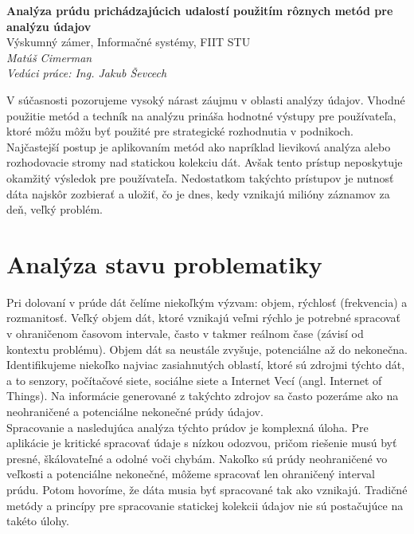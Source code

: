 \documentclass[11pt]{article}
\begin{document}
\begin{center}
	{\LARGE \textbf{Analýza prúdu prichádzajúcich udalostí použitím rôznych metód pre analýzu údajov}}\\
	{\Large Výskumný zámer, Informačné systémy, FIIT STU}
	\\
	{\large \textit{Matúš Cimerman}}
	\\
	{\large \textit{Vedúci práce: Ing. Jakub Ševcech}}
\end{center}
V súčasnosti pozorujeme vysoký nárast záujmu v oblasti analýzy údajov. Vhodné použitie metód a techník na analýzu prináša hodnotné výstupy pre používateľa, ktoré môžu môžu byť použité pre strategické rozhodnutia v podnikoch. Najčastejší postup je aplikovaním metód ako napríklad lieviková analýza alebo rozhodovacie stromy nad statickou kolekciu dát. Avšak tento prístup neposkytuje okamžitý výsledok pre používateľa. Nedostatkom takýchto prístupov je nutnosť dáta najskôr zozbierať a uložiť, čo je dnes, kedy vznikajú milióny záznamov za deň, veľký problém.
\newline
\section{Analýza stavu problematiky}
Pri dolovaní v prúde dát čelíme niekoľkým výzvam: objem,  rýchlosť (frekvencia) a rozmanitosť. Veľký objem dát, ktoré vznikajú veľmi rýchlo je potrebné spracovať v ohraničenom časovom intervale, často v takmer reálnom čase (závisí od kontextu problému). Objem dát sa neustále zvyšuje, potenciálne až do nekonečna. Identifikujeme niekoľko najviac zasiahnutých oblastí, ktoré sú zdrojmi týchto dát, a to senzory, počítačové siete, sociálne siete a Internet Vecí (angl. Internet of Things). Na informácie generované z takýchto zdrojov sa často pozeráme ako na neohraničené a potenciálne nekonečné prúdy údajov. 
\\
Spracovanie a nasledujúca analýza týchto prúdov je komplexná úloha. Pre aplikácie je kritické spracovať údaje s nízkou odozvou, pričom riešenie musú byť presné, škálovateľné a odolné voči chybám. Nakoľko sú prúdy neohraničené vo veľkosti a potenciálne nekonečné, môžeme spracovať len ohraničený interval prúdu. Potom hovoríme, že dáta musia byť spracované tak ako vznikajú. Tradičné metódy a princípy pre spracovanie statickej kolekcii údajov nie sú postačujúce na takéto úlohy. 
\\
\end{document}
